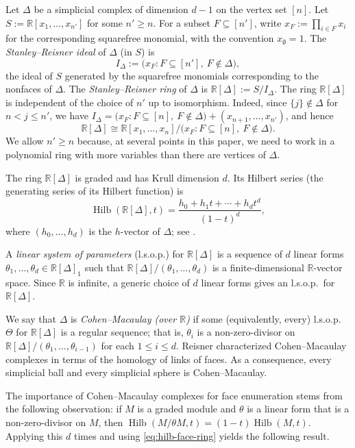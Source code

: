 \documentclass[11pt]{article}
\theoremstyle{definition}
\numberwithin{equation}{theorem}
\newcommand{\kk}{{\mathbb R}}
\begin{document}
Let $\Delta$ be a simplicial complex of dimension $d-1$ on the vertex set $[n]$. Let $S:=\kk[x_1,\dots,x_{n'}]$ for some $n'\ge n$. For a subset $F\subseteq[n']$, write $x_F:=\prod_{i\in F}x_i$ for the corresponding squarefree monomial, with the convention $x_\emptyset=1$. The \emph{Stanley--Reisner ideal} of $\Delta$ (in $S$) is
\[
  I_\Delta:=\bigl(x_F : F\subseteq[n'],\ F\notin\Delta\bigr),
\]
the ideal of $S$ generated by the squarefree monomials corresponding to the nonfaces of $\Delta$. The \emph{Stanley--Reisner ring} of $\Delta$ is $\kk[\Delta]:=S/I_\Delta$.
The ring $\kk[\Delta]$ is independent of the choice of $n'$ up to isomorphism. Indeed, since $\{j\}\notin\Delta$ for $n<j\le n'$, we have
$I_\Delta=\bigl(x_F : F\subseteq[n],\ F\notin\Delta\bigr)+(x_{n+1},\dots,x_{n'})$, and hence
\[
  \kk[\Delta]\cong\kk[x_1,\dots,x_n]/\bigl(x_F : F\subseteq[n],\ F\notin\Delta\bigr).
\]
We allow $n'\ge n$ because, at several points in this paper, we need to work in a polynomial ring with more variables than there are vertices of $\Delta$.

The ring $\kk[\Delta]$ is graded and has Krull dimension $d$. Its Hilbert series (the generating series of its Hilbert function) is
\begin{equation}\label{eq:hilb-face-ring}
  \operatorname{Hilb}(\kk[\Delta],t)=\frac{h_0+h_1t+\cdots+h_dt^d}{(1-t)^d},
\end{equation}
where $(h_0,\dots,h_d)$ is the $h$-vector of $\Delta$; see \cite[Sec.~II.1]{Stanley1996}.

 
A \emph{linear system of parameters} (l.s.o.p.) for $\kk[\Delta]$ is a sequence of $d$ linear
forms $\theta_1,\dots,\theta_d\in\kk[\Delta]_1$ such that $\kk[\Delta]/(\theta_1,\dots,\theta_d)$ is a finite-dimensional $\kk$-vector space. Since $\kk$ is infinite, a generic choice of $d$ linear forms gives an l.s.o.p.\ for $\kk[\Delta]$.
 
We say that $\Delta$ is \emph{Cohen--Macaulay (over $\kk$)} if some (equivalently, every) l.s.o.p.~$\Theta$ for $\kk[\Delta]$ is a regular sequence; that is, $\theta_i$ is a non-zero-divisor on
$\kk[\Delta]/(\theta_1,\dots,\theta_{i-1})$ for each $1\le i\le d$. Reisner \cite{Reisner1976} characterized Cohen--Macaulay complexes in terms of the homology of links of faces. As a consequence, every simplicial ball and every simplicial sphere is Cohen--Macaulay.
 
The importance of Cohen--Macaulay complexes for face enumeration stems from the following
observation: if $M$ is a graded module and $\theta$ is a linear form that is a non-zero-divisor
on $M$, then $\operatorname{Hilb}(M/\theta M,t)=(1-t)\operatorname{Hilb}(M,t)$. Applying this
$d$ times and using \eqref{eq:hilb-face-ring} yields the following result.
 
\end{document}
